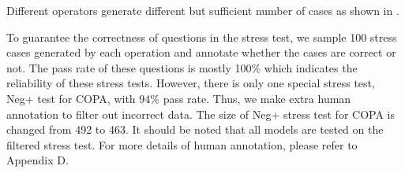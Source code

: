 Different operators generate different but sufficient number of cases 
as shown in .

To guarantee the correctness of questions in the stress test,
we sample 100 stress cases generated by each operation  
and annotate whether the cases are correct or not. The pass rate of these 
questions is mostly 100\% which indicates the 
reliability of these stress tests. However, there is only 
one special stress test, Neg+ test for COPA, 
with 94\% pass rate. Thus, we 
make extra human annotation to filter out incorrect data. The size of Neg+ 
stress test for COPA is changed from 492 to 463. It should be noted that 
all models are 
tested on the filtered stress test. 
For more details of human annotation, please refer to Appendix D.





